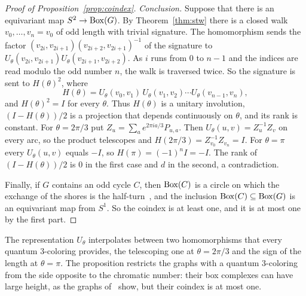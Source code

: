\begin{proof}[Proof of Proposition~\ref{prop:coindex}]
\emph{Conclusion.} Suppose that there is an equivariant map $S^2\to\operatorname{Box}(G)$. By Theorem~\ref{thm:stw} there is a closed walk $v_0,\ldots,v_n=v_0$ of odd length with trivial signature. The homomorphism sends the factor $(v_{2i},v_{2i+1})(v_{2i+2},v_{2i+1})^{-1}$ of the signature to $U_\theta(v_{2i},v_{2i+1})U_\theta(v_{2i+1},v_{2i+2})$. As $i$ runs from $0$ to $n-1$ and the indices are read modulo the odd number $n$, the walk is traversed twice. So the signature is sent to $H(\theta)^2$, where
\[
 H(\theta)=U_\theta(v_0,v_1)\,U_\theta(v_1,v_2)\cdots U_\theta(v_{n-1},v_n),
\]
and $H(\theta)^2=I$ for every $\theta$. Thus $H(\theta)$ is a unitary involution, $(I-H(\theta))/2$ is a projection that depends continuously on $\theta$, and its rank is constant. For $\theta=2\pi/3$ put $Z_u=\sum_ae^{2\pi ia/3}P_{u,a}$. Then $U_\theta(u,v)=Z_u^{-1}Z_v$ on every arc, so the product telescopes and $H(2\pi/3)=Z_{v_0}^{-1}Z_{v_n}=I$. For $\theta=\pi$ every $U_\theta(u,v)$ equals $-I$, so $H(\pi)=(-1)^nI=-I$. The rank of $(I-H(\theta))/2$ is $0$ in the first case and $d$ in the second, a contradiction.

Finally, if $G$ contains an odd cycle $C$, then $\operatorname{Box}(C)$ is a circle on which the exchange of the shores is the half-turn~\cite[proof of Theorem~7.1]{Z}, and the inclusion $\operatorname{Box}(C)\subseteq\operatorname{Box}(G)$ is an equivariant map from $S^1$. So the coindex is at least one, and it is at most one by the first part.
\end{proof}

The representation $U_\theta$ interpolates between two homomorphisms that every quantum $3$-coloring provides, the telescoping one at $\theta=2\pi/3$ and the sign of the length at $\theta=\pi$. The proposition restricts the graphs with a quantum $3$-coloring from the side opposite to the chromatic number: their box complexes can have large height, as the graphs of~\cite{Z} show, but their coindex is at most one.
